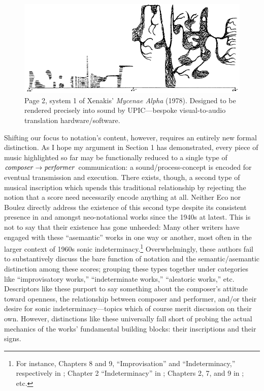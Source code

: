             \begin{figure} 
                \centering
                \includegraphics[width=.9\textwidth]{images/chapter2/mycenae.png}
                \captionsetup{width=.5\textwidth}
                \caption[Page 2, system 1 of Xenakis' \textit{Mycenae Alpha} (1978). Designed to be rendered precisely into sound by UPIC---bespoke visual-to-audio translation hardware/software.]{Page 2, system 1 of Xenakis' \textit{Mycenae Alpha} (1978). Designed to be rendered precisely into sound by UPIC---bespoke visual-to-audio translation hardware/software.\footnotemark}
                \label{fig:mycenae}
            \end{figure}
    
    \noindent Shifting our focus to notation's content, however, requires an entirely new formal distinction. As I hope my argument in Section 1 has demonstrated, every piece of music highlighted so far may be functionally reduced to a single type of $\text{\textit{composer}} \rightarrow \text{\textit{performer}}$ communication: a sound/process-concept is encoded for eventual transmission and execution. There exists, though, a second type of musical inscription which upends this traditional relationship by rejecting the notion that a score need necessarily encode anything at all. Neither Eco nor Boulez directly address the existence of this second type despite its consistent presence in and amongst neo-notational works since the 1940s at latest. This is not to say that their existence has gone unheeded: Many other writers have engaged with these ``asemantic'' works in one way or another, most often in the larger context of 1960s sonic indeterminacy.\footnote{For instance, Chapters 8 and 9, ``Improvisation'' and ``Indeterminacy,'' respectively in \cite{Cope_1984}; Chapter 2 ``Indeterminacy'' in \cite{Taruskin_2009d}; Chapters 2, 7, and 9 in \cite{Griffiths_2011}; etc.} Overwhelmingly, these authors fail to substantively discuss the bare function of notation and the semantic/asemantic distinction among these scores; grouping these types together under categories like ``improvisatory works,'' ``indeterminate works,'' ``aleatoric works,'' etc. Descriptors like these purport to say something about the composer's attitude toward openness, the relationship between composer and performer, and/or their desire for sonic indeterminacy---topics which of course merit discussion on their own. However, distinctions like these universally fall short of probing the actual mechanics of the works' fundamental building blocks: their inscriptions and their signs.

